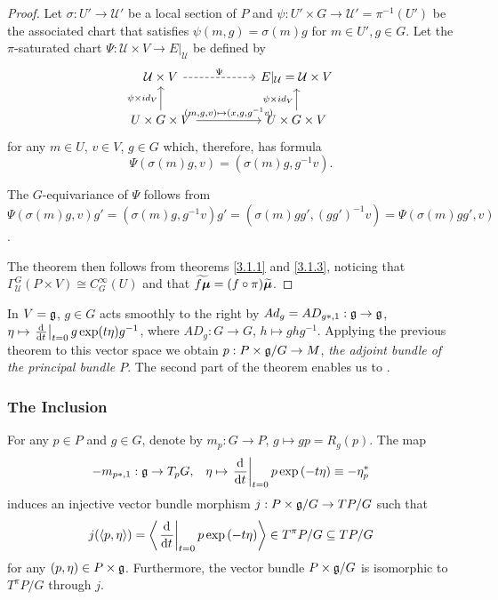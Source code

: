 \begin{proof}
Let $\sigma: U' \to \mathcal U'$ be a local section of $P$ and $\psi: U' \times G \to \mathcal U' = \pi^{-1}(U')$ be the associated chart that satisfies $\psi(m, g) = \sigma(m)g$ for $m \in U', g \in G$. Let the $\pi$-saturated chart $\Psi: \mathcal U \times V \to E|_{\mathcal U}$ be defined by
\begin{equation*}
    \begin{tikzcd}
        \mathcal U \times V \arrow[dashed]{rr}{\Psi} && E|_{\mathcal U} = \mathcal U \times V \\
        U \times G \times V \arrow{u}{\psi \times id_V} \arrow{rr}{(m, g, v) \mapsto (x, g, g^{-1}v)}    && U \times G \times V \arrow{u}{\psi \times id_V}
    \end{tikzcd}
\end{equation*}
for any $m \in U$, $v \in V$, $g \in G$ which, therefore, has formula
\[
    \Psi(\sigma(m)g, v) = (\sigma(m)g, g^{-1}v).
\]

The $G$-equivariance of $\Psi$ follows from $\Psi(\sigma(m)g, v)g' = (\sigma(m)g, g^{-1}v)g' = (\sigma(m)gg', (gg')^{-1}v) = \Psi(\sigma(m)gg', v)$.

The theorem then follows from theorems \ref{3.1.1} and \ref{3.1.3}, noticing that $\Gamma_{\mathcal U}^G(P \times V) \cong C^\infty_G(U)$ and that $\widetilde{f \bm{\mu}} = (f \circ \pi) \widetilde{\bm{\mu}}$.
\end{proof}

In $V = \mathfrak{g}$, $g \in G$ acts smoothly to the right by $Ad_g = AD_{g*, 1}: \mathfrak{g} \to \mathfrak{g}$, $\eta \mapsto \der{t}[t = 0] g \exp(t \eta) g^{-1}$, where $AD_g: G \to G$, $h \mapsto g h g^{-1}$. Applying the previous theorem to this vector space we obtain $p: P \times \mathfrak{g}/G \to M$, \emph{the adjoint bundle of the principal bundle $P$}. The second part of the theorem enables us to .

\subsubsection{The Inclusion}

\begin{theorem}
For any $p \in P$ and $g \in G$, denote by $m_p: G \to P$, $g \mapsto gp = R_g(p)$. The map 
    \begin{align}
        -m_{p*, 1}: \alg g \to T_p G,& &\eta \mapsto \der{t}[t = 0]p \exp{(-t \eta)} \equiv -\eta^*_p
    \end{align}
    induces an injective vector bundle morphism $j: P \times \mathfrak{g} / G \to TP/G$ such that 
    \begin{align}\label{formulaJ}
        j(\cl{p, \alg \eta}) = \cl{\der{t}[t = 0] p \exp{(-t \alg \eta)}} \in T^\pi P/G \subset TP/G
    \end{align} for any $(p, \mathfrak{\eta}) \in P \times \mathfrak{g}$. Furthermore, the vector bundle $P \times \mathfrak{g}/G$ is isomorphic to $T^\pi P/G$ through $j$.
\end{theorem}

